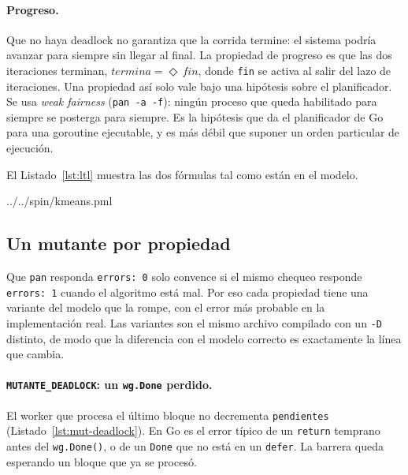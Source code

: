 \paragraph{Progreso.} Que no haya deadlock no garantiza que la corrida termine: el sistema podría
avanzar para siempre sin llegar al final. La propiedad de progreso es que las dos iteraciones
terminan, $\textit{termina} = \Diamond\, \textit{fin}$, donde \texttt{fin} se activa al salir del
lazo de iteraciones. Una propiedad así solo vale bajo una hipótesis sobre el planificador. Se usa
\emph{weak fairness} (\texttt{pan -a -f}): ningún proceso que queda habilitado para siempre se
posterga para siempre. Es la hipótesis que da el planificador de Go para una goroutine ejecutable, y
es más débil que suponer un orden particular de ejecución.

El Listado~\ref{lst:ltl} muestra las dos fórmulas tal como están en el modelo.


                {../../spin/kmeans.pml}

\subsection{Un mutante por propiedad}

Que \texttt{pan} responda \texttt{errors: 0} solo convence si el mismo chequeo responde
\texttt{errors: 1} cuando el algoritmo está mal. Por eso cada propiedad tiene una variante del
modelo que la rompe, con el error más probable en la implementación real. Las variantes son el
mismo archivo compilado con un \texttt{-D} distinto, de modo que la diferencia con el modelo correcto
es exactamente la línea que cambia.

\paragraph{\texttt{MUTANTE\_DEADLOCK}: un \texttt{wg.Done} perdido.} El worker que procesa el
último bloque no decrementa \texttt{pendientes} (Listado~\ref{lst:mut-deadlock}). En Go es el error
típico de un \texttt{return} temprano antes del \texttt{wg.Done()}, o de un \texttt{Done} que no está
en un \texttt{defer}. La barrera queda esperando un bloque que ya se procesó.



